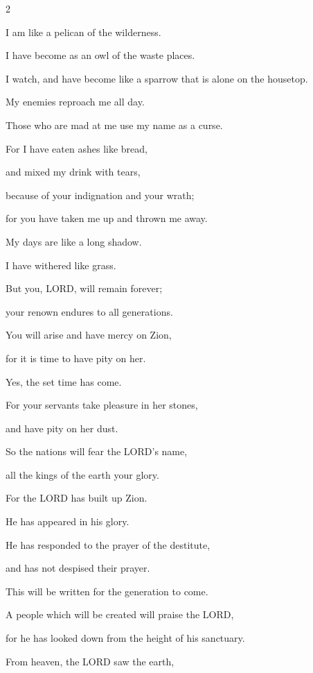 \begin{multicols}{2}
	
	\myverse{}I am like a pelican of the wilderness.
	
	I have become as an owl of the waste places.
	
	
	\myverse{}I watch, and have become like a sparrow that is alone
	on the housetop.
	
	
	\myverse{}My enemies reproach me all day.
	
	Those who are mad at me use my name as a curse.
	
	
	\myverse{}For I have eaten ashes like bread,
	
	and mixed my drink with tears,
	
	
	\myverse{}because of your indignation and your wrath;
	
	for you have taken me up and thrown me away.
	
	
	\myverse{}My days are like a long shadow.
	
	I have withered like grass.
	
	\vspace{\baselineskip}
	
	\myverse{}But you, LORD, will remain forever;
	
	your renown endures to all generations.
	
	
	\myverse{}You will arise and have mercy on Zion,
	
	for it is time to have pity on her.
	
	Yes, the set time has come.
	
	
	\myverse{}For your servants take pleasure in her stones,
	
	and have pity on her dust.
	
	
	\myverse{}So the nations will fear the LORD’s name,
	
	all the kings of the earth your glory.
	
	
	\myverse{}For the LORD has built up Zion.
	
	He has appeared in his glory.
	
	
	\myverse{}He has responded to the prayer of the destitute,
	
	and has not despised their prayer.
	
	
	\myverse{}This will be written for the generation to come.
	
	A people which will be created will praise the LORD,
	
	
	\myverse{}for he has looked down from the height of his sanctuary.
	
	From heaven, the LORD saw the earth,
	

\end{multicols}
